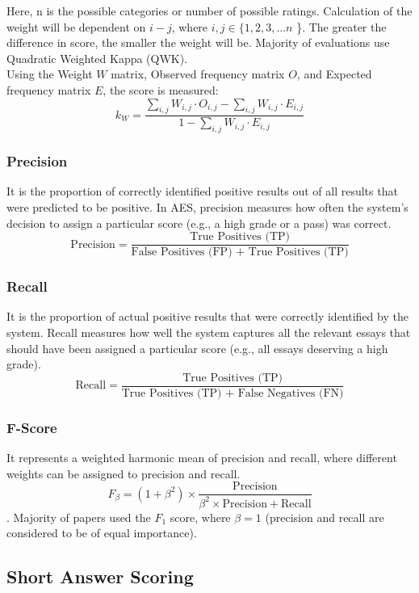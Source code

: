 \documentclass{article}
\begin{document}
	Here, n is the possible categories or number of possible ratings. Calculation of the weight will be dependent on $i - j$, where $i, j \in \{ 1, 2, 3, \dots n$ \}. The greater the difference in score, the smaller the weight will be. Majority of evaluations use Quadratic Weighted Kappa (QWK). \\
	Using the Weight $W$ matrix, Observed frequency matrix $O$, and Expected frequency matrix $E$, the score is measured:
	$$k_W = \frac{\sum_{i, j} W_{i, j} \cdot O_{i, j} - \sum_{i, j} W_{i, j} \cdot E_{i, j}}{1 - \sum_{i, j} W_{i, j} \cdot E_{i,j}}$$
	\subsubsection*{Precision}
	It is the proportion of correctly identified positive results out of all results that were predicted to be positive. In AES, precision measures how often the system's decision to assign a particular score (e.g., a high grade or a pass) was correct.
	$$\text{Precision} = \frac{\text{True Positives (TP)}}{\text{False Positives (FP) + True Positives (TP)}}$$
	\subsubsection*{Recall}
	It is the proportion of actual positive results that were correctly identified by the system. Recall measures how well the system captures all the relevant essays that should have been assigned a particular score (e.g., all essays deserving a high grade).
	$$\text{Recall} = \frac{\text{True Positives (TP)}}{\text{True Positives (TP) + False Negatives (FN)}}$$
	\subsubsection*{F-Score}
	It represents a weighted harmonic mean of precision and recall, where different weights can be assigned to precision and recall.
	$$F_\beta = (1 + \beta^2) \times \frac{\text{Precision}}{\beta^2 \times \text{Precision} + \text{Recall}}$$. Majority of papers used the $F_1$ score, where $\beta = 1$ (precision and recall are considered to be of equal importance).
	
	\subsection{Short Answer Scoring}
	
\end{document}
